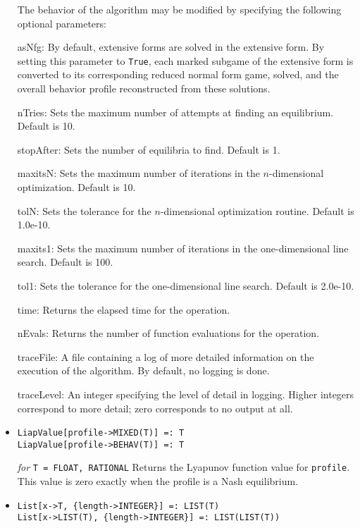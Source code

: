 \begin{itemize}
The behavior of the algorithm may be modified by specifying the following
optional parameters:
\bd
\item
[asNfg:] By default, extensive forms are solved in the extensive form.
By setting this parameter to \verb+True+, each marked subgame of the
extensive form is converted to its corresponding reduced normal form game,
solved, and the overall behavior profile reconstructed from these
solutions.
\item
[nTries:] Sets the maximum number of attempts at finding an
equilibrium. Default is 10.
\item
[stopAfter:] Sets the number of equilibria to find.  Default is 1.
\item
[maxitsN:] Sets the maximum number of iterations in the
$n$-dimensional optimization.  Default is 10.
\item
[tolN:] Sets the tolerance for the $n$-dimensional optimization
routine.  Default is 1.0e-10.
\item
[maxits1:] Sets the maximum number of iterations in the
one-dimensional line search.  Default is 100.
\item
[tol1:] Sets the tolerance for the one-dimensional line search.
Default is 2.0e-10.
\item
[time:] Returns the elapsed time for the operation.
\item
[nEvals:] Returns the number of function evaluations for the operation.
\item
[traceFile:] A file containing a log of more detailed information on the
execution of the algorithm.  By default, no logging is done.
\item
[traceLevel:] An integer specifying the level of detail in logging.
Higher integers correspond to more detail; zero corresponds to no output
at all.
\ed
\ed

\item{}
\protect \large \begin{verbatim}
LiapValue[profile->MIXED(T)] =: T
LiapValue[profile->BEHAV(T)] =: T
\end{verbatim} \normalsize

{\it for} {\tt T = FLOAT, RATIONAL}
\bd 
Returns the Lyapunov function value for \verb+profile+.
This value is zero exactly when the
profile is a Nash equilibrium.
\ed

\item{}
\protect \large \begin{verbatim}
List[x->T, {length->INTEGER}] =: LIST(T)
List[x->LIST(T), {length->INTEGER}] =: LIST(LIST(T))
\end{verbatim}\normalsize


\end{itemize}

